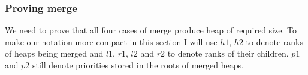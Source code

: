 \subsubsection{Proving merge}

We need to prove that all four cases of merge produce heap of required size. To make our notation more compact in this section I will use $h1$, $h2$ to denote ranks of heaps being merged and $l1$, $r1$, $l2$ and $r2$ to denote ranks of their children. $p1$ and $p2$ still denote priorities stored in the roots of merged heaps.











 